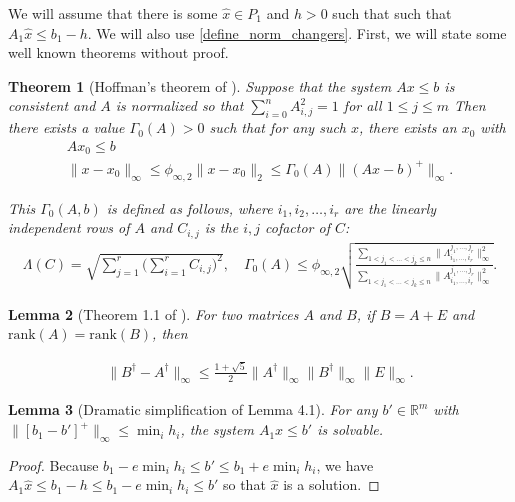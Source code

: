 \documentclass{article}
\newtheorem{theorem}{Theorem}[section]
\newtheorem{lemma}[theorem]{Lemma}
\theoremstyle{case}
\newcommand{\Rm}{\mathbb R^m}
\newcommand{\huff}{{\Gamma_0}}
\begin{document}
We will assume that there is some $\hat x \in P_1$ and $h > 0$ such that such that $A_1 \hat x \le b_1 - h$.
We will also use \cref{define_norm_changers}.
First, we will state some well known theorems without proof.
\begin{theorem}[Hoffman's theorem of \cite{dummy:hoffman}]
\label{hoffman}
Suppose that the system $Ax \le b$ is consistent and $A$ is normalized so that $\sum_{i = 0}^n{A}_{i,j}^2 = 1$ for all $1 \le j \le m$
Then there exists a value $\huff(A) > 0$ such that for any such $x$, there exists an $x_0$ with
\begin{align*}
Ax_0 \le b \\
\|x - x_0\|_{\infty} \le \phi_{\infty, 2}\|x - x_0\|_2 \le {\huff(A)} \|(Ax - b)^+\|_\infty.
\end{align*}

This $\huff(A,b)$ is defined as follows, where $i_1, i_2, \ldots, i_r$ are the linearly independent rows of $A$ and $C_{i,j}$ is the $i,j$ cofactor of $C$:
\begin{align*}
\Lambda(C) = \sqrt{\sum_{j=1}^r\bigg(\sum_{i=1}^r C_{i,j}\bigg)^2}, \quad
{\huff(A)} \le \phi_{\infty, 2}\sqrt{\frac{\sum_{1 < j_1 < \ldots < j_k \le n} \|\Lambda^{j_1,\ldots,j_r}_{i_1,\ldots, i_r}\|_{\infty}^2}{\sum_{1 < j_1 < \ldots < j_k \le n} \|A^{j_1,\ldots,j_r}_{i_1,\ldots, i_r}\|_{\infty}^2}}.
\end{align*}
\end{theorem}


\begin{lemma}[Theorem 1.1 of \cite{dummy:continuity_of_inverse}]
\label{inverse_is_continuous}
For two matrices $A$ and $B$, if $B = A + E$ and $\text{rank}(A) = \text{rank}(B)$, then

\begin{align*}
\|B^{\dagger} - A^{\dagger} \|_\infty \le \frac{1 + \sqrt{5}}{2} \|A^{\dagger}\|_\infty\|B^{\dagger}\|_\infty\|E\|_\infty.
\end{align*}
\end{lemma}



\begin{lemma}[Dramatic simplification of Lemma 4.1]
\label{4_1}
For any $b' \in \Rm$ with $\|\left[b_1 - b'\right]^+\|_{\infty} \le \min_i h_i$, the system $A_1x \le b'$ is solvable.
\end{lemma}

\begin{proof}
Because $b_1 - e \min_i h_i \le b' \le b_1 + e \min_i h_i$, we have $A_1\hat x\le b_1 - h\le b_1 - e \min_i h_i \le b'$ so that $\hat x$ is a solution.
\end{proof}
\end{document}
